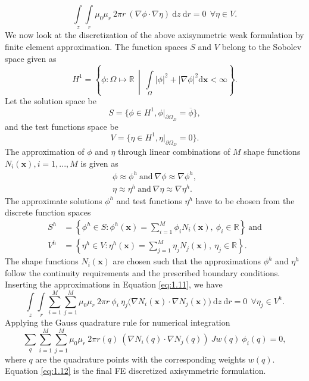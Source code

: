\documentclass[11pt,a4paper,final]{article}
\newcommand{\seminorm}[1]{\left\lvert #1 \right\rvert}
\begin{document}
\begin{equation}
\int\limits_{z} \int\limits_{r} \mu_0 \mu_r \ 2 \pi r \ (\nabla \phi \cdot \nabla \eta) \ \mathrm{d}z \ \mathrm{d}r = 0 \ \ \forall \eta \in V.
\label{eq:1.11}
\end{equation}
We now look at the discretization of the above axisymmetric weak formulation by finite element approximation. The function spaces $S$ and $V$ belong to the Sobolev space given as
\begin{equation}
H^1 = \left\lbrace \phi : \Omega \mapsto \mathbb{R} \,\middle\vert\, \int\limits_{\Omega} \seminorm{\phi}^2 + \seminorm{\nabla \phi}^2 \mathrm{d}\mathbf{x} < \infty \right\rbrace.
\end{equation}
Let the solution space be
\begin{equation}
S = \{ \phi \in H^1, \phi|_{\partial \Omega_{D}} = \overline{\phi} \},
\end{equation}
and the test functions space be
\begin{equation}
V = \{ \eta \in H^1, \eta|_{\partial \Omega_{D}} = 0\}.
\end{equation}
The approximation of $\phi$ and $\eta$ through linear combinations of $M$ shape functions $N_i (\mathbf{x}), i =1,...,M$ is given as
\begin{align}
\phi \approx \phi^h \ \text{and} \ \nabla \phi \approx \nabla \phi^h, \nonumber\\
\eta \approx \eta^h \ \text{and} \ \nabla \eta \approx \nabla \eta^h.
\end{align}
The approximate solutions $\phi^h$ and test functions $\eta^h$ have to be chosen from the discrete function spaces 
\begin{align}
S^h &= \left\{\phi^h \in S : \phi^h(\textbf{x}) = \sum_{i=1}^{\textit{M}} \phi_i N_i (\textbf{x}), \ \phi_i \in \mathbb{R} \right\} \ \text{and} \nonumber\\
V^h &= \left\{\eta^h \in V : \eta^h(\textbf{x}) = \sum_{j=1}^{\textit{M}} \eta_j N_j (\textbf{x}), \ \eta_j \in \mathbb{R} \right\}.
\end{align}
The shape functions $N_i (\mathbf{x})$ are chosen such that the approximations $\phi^h$ and $\eta^h$ follow the continuity requirements and the prescribed boundary conditions. Inserting the approximations in Equation \eqref{eq:1.11}, we have
\begin{equation}
\int\limits_{z} \int\limits_{r} \sum\limits_{i=1}^{M} \sum\limits_{j=1}^{M} \mu_0 \mu_r \ 2 \pi r \ \phi_i \ \eta_j \Big( \nabla N_i (\mathbf{x}) \cdot \nabla N_j (\mathbf{x}) \Big) \ \mathrm{d}z \ \mathrm{d}r = 0 \ \ \forall \eta_j \in V^h.
\end{equation}
Applying the Gauss quadrature rule for numerical integration
\begin{equation}
\sum\limits_{q} \sum\limits_{i=1}^{M} \sum\limits_{j=1}^{M} \mu_0 \mu_r \ 2 \pi r(q) \ (\nabla N_i (q) \cdot \nabla N_j (q)) \ J w(q) \ \phi_i(q)= 0,
\label{eq:1.12}
\end{equation}
where $q$ are the quadrature points with the corresponding weights $w(q)$. Equation \eqref{eq:1.12} is the final FE discretized axisymmetric formulation.
\end{document}
